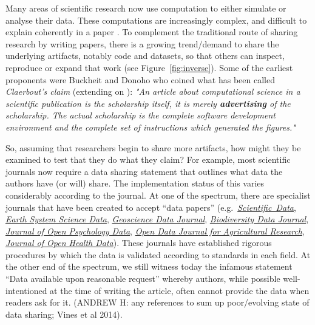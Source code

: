 \documentclass[12pt]{article}
\begin{document}
Many areas of scientific research now use computation to either simulate
or analyse their data. These computations are increasingly complex, and
difficult to explain coherently in a paper \citep{marwick_how_2015}.
To complement the traditional route of sharing research by writing papers,
there is a growing trend/demand to share the underlying artifacts, notably 
code and datasets, so that others can inspect, reproduce or expand that work
(see Figure~\ref{fig:inverse}).
Some of the earliest proponents were Buckheit and Donoho
\cite{buckheit_wavelab_1995} who coined what has been called 
\emph{Claerbout's claim} (extending on \citet{claerbout_electronic_1992}):
\emph{"An article about computational science in a scientific publication 
is  the scholarship itself, it is merely \textbf{advertising} of
the scholarship. The actual scholarship is the complete software development
environment and the complete set of instructions which generated the 
figures."}

So, assuming that researchers begin to share more artifacts, how might
they be examined to test that they do what they claim? For example,
most scientific journals now require a data sharing statement that
outlines what data the authors have (or will) share.
The implementation status of this varies considerably according to the
journal. At one of the spectrum, there are specialist journals that
have been created to accept ``data papers''
(e.g.~\href{https://www.nature.com/sdata/}{\emph{Scientific~Data}}, 
\href{https://essd.copernicus.org/}{\emph{Earth System Science Data}}, 
\href{https://rmets.onlinelibrary.wiley.com/journal/20496060}{\emph{Geoscience Data Journal}},
\href{https://bdj.pensoft.net/}{\emph{Biodiversity Data Journal}},
\href{https://openpsychologydata.metajnl.com/}{\emph{Journal of Open Psychology Data}},
\href{https://odjar.org/}{\emph{Open Data Journal for Agricultural Research}},
\href{https://openhealthdata.metajnl.com}{\emph{Journal of Open Health Data}}).
These journals have established rigorous procedures by which
the data is validated according to standards in each field. At the
other end of the spectrum, we still witness today the infamous
statement ``Data available upon reasonable request'' whereby authors,
while possible well-intentioned at the time of writing the article,
often cannot provide the data when readers ask for
it.  (ANDREW H: any references to sum up poor/evolving state of data
sharing; Vines et al 2014).
\end{document}
